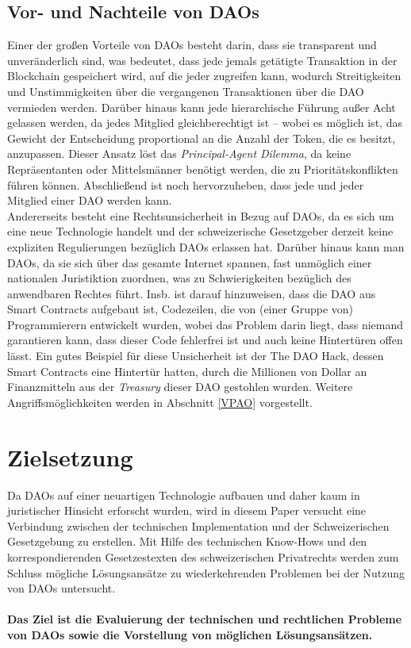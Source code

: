 \documentclass[a4paper,12pt]{report}
\begin{document}
        \subsection{Vor- und Nachteile von DAOs}
        \startsubsection
            Einer der großen Vorteile von DAOs besteht darin, dass sie transparent und unveränderlich sind, was bedeutet, dass jede jemals getätigte Transaktion in der Blockchain gespeichert wird, auf die jeder zugreifen kann, wodurch Streitigkeiten und Unstimmigkeiten über die vergangenen Transaktionen über die DAO vermieden werden. Darüber hinaus kann jede hierarchische Führung außer Acht gelassen werden, da jedes Mitglied gleichberechtigt ist – wobei es möglich ist, das Gewicht der Entscheidung proportional an die Anzahl der Token, die es besitzt, anzupassen. Dieser Ansatz löst das \textit{Principal-Agent Dilemma}, da keine Repräsentanten oder Mittelsmänner benötigt werden, die zu Prioritätskonflikten führen können. Abschließend ist noch hervorzuheben, dass jede und jeder Mitglied einer DAO werden kann. \\
            Andererseits besteht eine Rechtsunsicherheit in Bezug auf DAOs, da es sich um eine neue Technologie handelt und der schweizerische Gesetzgeber derzeit keine expliziten Regulierungen bezüglich DAOs erlassen hat. Darüber hinaus kann man DAOs, da sie sich über das gesamte Internet spannen, fast unmöglich einer nationalen Juristiktion zuordnen, was zu Schwierigkeiten bezüglich des anwendbaren Rechtes führt. Insb. ist darauf hinzuweisen, dass die DAO aus Smart Contracts aufgebaut ist, Codezeilen, die von (einer Gruppe von) Programmierern entwickelt wurden, wobei das Problem darin liegt, dass niemand garantieren kann, dass dieser Code fehlerfrei ist und auch keine Hintertüren offen lässt. Ein gutes Beispiel für diese Unsicherheit ist der The DAO Hack, dessen Smart Contracts eine Hintertür hatten, durch die Millionen von Dollar an Finanzmitteln aus der \textit{Treasury} dieser DAO gestohlen wurden. Weitere Angriffsmöglichkeiten werden in Abschnitt \ref{VPAO} vorgestellt.
        \closesection
    \closesection
    \newpage
	\section{Zielsetzung}
	\startsection
	    Da DAOs auf einer neuartigen Technologie aufbauen und daher kaum in juristischer Hinsicht erforscht wurden, wird in diesem Paper versucht eine Verbindung zwischen der technischen Implementation und der Schweizerischen Gesetzgebung zu erstellen. Mit Hilfe des technischen Know-Hows und den korrespondierenden Gesetzestexten des schweizerischen Privatrechts werden zum Schluss mögliche Lösungsansätze zu wiederkehrenden Problemen bei der Nutzung von DAOs untersucht. \\ \\
	    \textbf{Das Ziel ist die Evaluierung der technischen und rechtlichen Probleme von DAOs sowie die Vorstellung von möglichen Lösungsansätzen.}
	\closesection
	
\end{document}
